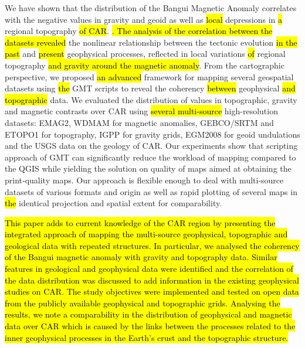 \documentclass[minerals,article,submit,pdftex,moreauthors]{Definitions/mdpi}
\begin{document}
We have shown that the distribution of the Bangui Magnetic Anomaly correlates with the negative values in gravity and geoid as well as \hl{local }depressions in \hl{a }regional topography \hl{of CAR}. \hl{. The analysis of the correlation between the datasets revealed }the nonlinear relationship\hl{ }between the tectonic evolution \hl{in the past} and \hl{present }geophysical processes, reflected in local variations \hl{of} regional topography \hl{and gravity around the magnetic anomaly}. From the cartographic perspective, we proposed \hl{an advanced} framework for mapping several geospatial datasets using \hl{the }GMT scripts to reveal the coherency \hl{between }geophysical \hl{and topographic }data. We\hl{ }evaluated the distribution of values in topographic, gravity and magnetic contrasts over CAR using \hl{several multi-source }high-resolution\hl{ }datasets: EMAG2, WDMAM for magnetic anomalies, GEBCO/SRTM and ETOPO1 for topography, IGPP for gravity grids, EGM2008 for geoid undulations and the USGS data on the geology of CAR. Our experiments show that scripting approach of GMT can significantly reduce the workload of mapping compared to the QGIS while yielding the solution on quality of maps aimed at obtaining the print-quality maps. Our approach is\hl{ }flexible enough to deal with multi-source datasets of various formats and origin as well as rapid plotting of several maps in \hl{the }identical projection and spatial extent for comparability. 

\hl{This paper adds to current knowledge of the CAR region by presenting the integrated approach of mapping the multi-source geophysical, topographic and geological data with repeated structures. In particular, we analysed the coherency of the Bangui magnetic anomaly with gravity and topography data. Similar features in geological and geophysical data were identified and the correlation of the data distribution was discussed to add information in the existing geophysical studies on CAR. The study objectives were implemented and tested on open data from the publicly available geophysical and topographic grids. Analysing the results, we note a comparability in the distribution of geophysical and magnetic data over CAR which is caused by the links between the processes related to the inner geophysical processes in the Earth's crust and the topographic structure.}

\end{document}
